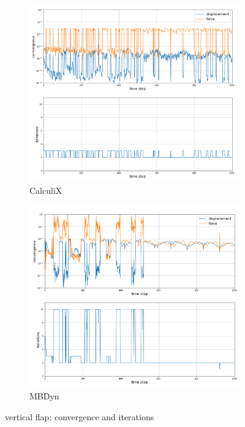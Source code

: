 \begin{figure}[htbp!]
	\centering
	\begin{subfigure}{0.8\textwidth}
	\centering
	\includegraphics[width=\textwidth, trim=0 0 0 20, clip]{images/vert_flap/CX_iterations_rho1.png}
	\caption{CalculiX}
	\label{fig:vf_cx_iter}
	\end{subfigure}
	\begin{subfigure}{0.9\textwidth}
	\centering
	\includegraphics[width=\textwidth, trim=0 0 0 20, clip]{images/vert_flap/MBD_iterations_rho1.png}
	\caption{MBDyn}
	\label{fig:vf_mbd_iter}
	\end{subfigure}
	\caption{vertical flap: convergence and iterations}
	\label{fig:vf_iter}
\end{figure}


